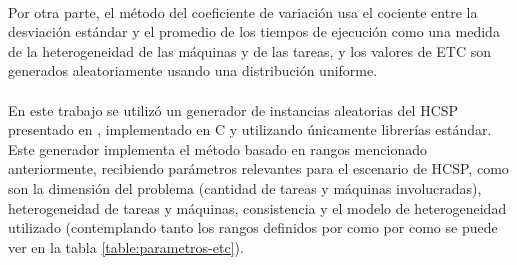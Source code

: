 \begin{table}[h!]
    \centering
    \caption{Parámetros de los modelos ETC}
    \label{table:parametros-etc}
\end{table}

\paragraph{}Por otra parte, el método del coeficiente de variación usa el cociente entre la desviación estándar y el promedio de los tiempos de ejecución como una medida de la heterogeneidad de las máquinas y de las tareas, y los valores de ETC son generados aleatoriamente usando una distribución uniforme.

\paragraph{}En este trabajo se utilizó un generador de instancias aleatorias del HCSP presentado en \citet{bib-doctorado-nesmachnow}, implementado en C y utilizando únicamente librerías estándar. Este generador implementa el método basado en rangos mencionado anteriormente, recibiendo parámetros relevantes para el escenario de HCSP, como son la dimensión del problema (cantidad de tareas y máquinas involucradas), heterogeneidad de tareas y máquinas, consistencia y el modelo de heterogeneidad utilizado (contemplando tanto los rangos definidos por \citet{bib-ali-hc-etc} como por \citet{bib-braun} como se puede ver en la tabla \ref{table:parametros-etc}).


